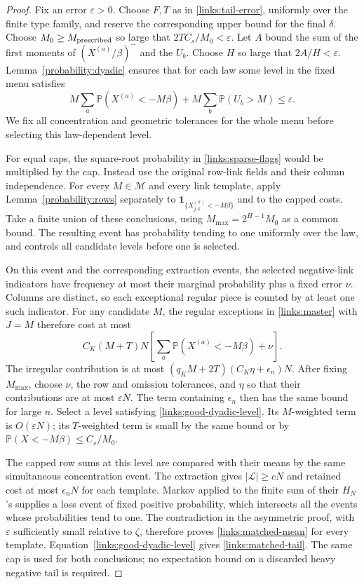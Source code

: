 \begin{proof}
Fix an error \(\varepsilon>0\). Choose \(F,T\) as in
\eqref{links:tail-error}, uniformly over the finite type family,
and reserve the corresponding upper bound for the final \(\delta\).
Choose \(M_0\ge M_{\rm prescribed}\) so large that
\(2TC_s/M_0<\varepsilon\). Let \(A\) bound the sum of the first
moments of \((X^{(a)}/\beta)^-\) and the \(U_b\). Choose \(H\) so
large that \(2A/H<\varepsilon\). Lemma~\ref{probability:dyadic}
ensures that for each law some level in the fixed menu satisfies
\begin{equation}
 M\sum_a\mathbb P(X^{(a)}<-M\beta)
       +M\sum_b\mathbb P(U_b>M)\le\varepsilon.
 \label{links:good-dyadic-level}
\end{equation}
We fix all concentration and geometric tolerances for the whole menu
before selecting this law-dependent level.

For equal caps, the square-root probability in
\eqref{links:sparse-flags} would be multiplied by the cap. Instead use
the original row-link fields and their column independence. For every
\(M\in\mathcal M\) and every link template, apply
Lemma~\ref{probability:rows} separately to
\(\mathbf1_{\{X_{j,k}^{(a)}<-M\beta\}}\) and to the capped costs.
Take a finite union of these conclusions, using
\(M_{\max}=2^{H-1}M_0\) as a common bound. The resulting event has
probability tending to one uniformly over the law, and controls all
candidate levels before one is selected.

On this event and the corresponding extraction events, the selected
negative-link indicators have frequency at most their marginal
probability plus a fixed error \(\nu\). Columns are distinct, so each
exceptional regular piece is counted by at least one such indicator.
For any candidate \(M\), the regular exceptions in
\eqref{links:master} with \(J=M\) therefore cost at most
\[
 C_K(M+T)N\left[\sum_a\mathbb P(X^{(a)}<-M\beta)+\nu\right].
\]
The irregular contribution is at most
\((q_KM+2T)(C_K\eta+\epsilon_n)N\).
After fixing \(M_{\max}\), choose \(\nu\), the row and omission
tolerances, and \(\eta\) so that their contributions are at most
\(\varepsilon N\). The term containing \(\epsilon_n\) then has the
same bound for large \(n\). Select a level satisfying
\eqref{links:good-dyadic-level}. Its \(M\)-weighted term is
\(O(\varepsilon N)\); its \(T\)-weighted term is small by the same
bound or by \(\mathbb P(X<-M\beta)\le C_s/M_0\).

The capped row sums at this level are compared with their means by
the same simultaneous concentration event. The extraction gives
\(|\mathcal L|\ge cN\) and retained cost at most \(\epsilon_nN\)
for each template. Markov applied to the finite sum of their \(H_N\)'s
supplies a loss event of fixed positive probability, which intersects
all the events whose probabilities tend to one. The contradiction in the asymmetric proof,
with \(\varepsilon\) sufficiently small relative to \(\zeta\),
therefore proves \eqref{links:matched-mean} for every template.
Equation~\eqref{links:good-dyadic-level} gives
\eqref{links:matched-tail}. The same cap is used for both conclusions;
no expectation bound on a discarded heavy negative tail is required.
\end{proof}
